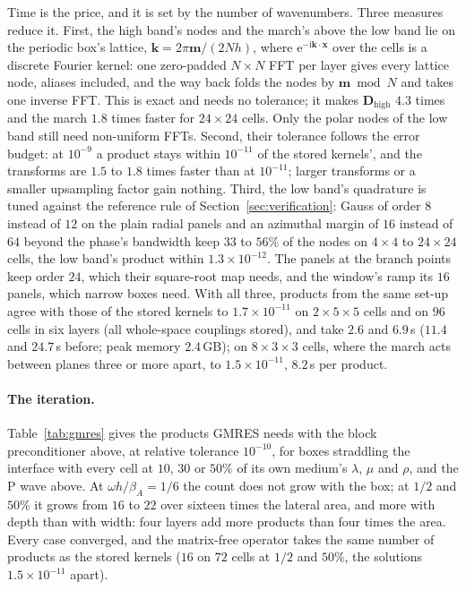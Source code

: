 \documentclass[11pt,a4paper]{article}
\newcommand{\bk}{\mathbf{k}}
\newcommand{\bx}{\mathbf{x}}
\newcommand{\ii}{\mathrm{i}}
\newcommand{\ee}{\mathrm{e}}
\begin{document}
Time is the price, and it is set by the number of wavenumbers. Three measures reduce it. First, the high band's
nodes and the march's above the low band lie on the periodic box's lattice, $\bk=2\pi\mathbf m/(2Nh)$, where
$\ee^{-\ii\bk\cdot\bx}$ over the cells is a discrete Fourier kernel: one zero-padded $N\times N$ FFT per layer gives
every lattice node, aliases included, and the way back folds the nodes by $\mathbf m\bmod N$ and takes one inverse
FFT. This is exact and needs no tolerance; it makes $\mathbf D_{\mathrm{high}}$ $4.3$ times and the march $1.8$
times faster for $24\times24$ cells. Only the polar nodes of the low band still need non-uniform FFTs. Second,
their tolerance follows the error budget: at $10^{-9}$ a product stays within $10^{-11}$ of the stored kernels',
and the transforms are $1.5$ to $1.8$ times faster than at $10^{-11}$; larger transforms or a smaller upsampling
factor gain nothing. Third, the low band's quadrature is tuned against the reference rule of
Section~\ref{sec:verification}: Gauss of order $8$ instead of $12$ on the plain radial panels and an azimuthal
margin of $16$ instead of $64$ beyond the phase's bandwidth keep $33$ to $56\%$ of the nodes on $4\times4$ to
$24\times24$ cells, the low band's product within $1.3\times10^{-12}$. The panels at the branch points keep
order $24$, which their square-root map needs, and the window's ramp its $16$ panels, which narrow boxes need.
With all three, products from the same set-up agree with those of the stored kernels to $1.7\times10^{-11}$ on
$2\times5\times5$ cells and on $96$ cells in six layers (all whole-space couplings stored), and take $2.6$ and
$6.9$\,s ($11.4$ and $24.7$\,s before; peak memory $2.4$\,GB); on $8\times3\times3$ cells, where the march acts
between planes three or more apart, to $1.5\times10^{-11}$, $8.2$\,s per product.

\paragraph{The iteration.} Table~\ref{tab:gmres} gives the products GMRES needs with the block preconditioner
above, at relative tolerance $10^{-10}$, for boxes straddling the interface with every cell at $10$, $30$ or $50\%$
of its own medium's $\lambda$, $\mu$ and $\rho$, and the P wave above. At $\omega h/\beta_A=1/6$ the count does not
grow with the box; at $1/2$ and $50\%$ it grows from $16$ to $22$ over sixteen times the lateral area, and more
with depth than with width: four layers add more products than four times the area. Every case converged, and the
matrix-free operator takes the same number of products as the stored kernels ($16$ on $72$ cells at $1/2$ and
$50\%$, the solutions $1.5\times10^{-11}$ apart).
\end{document}
